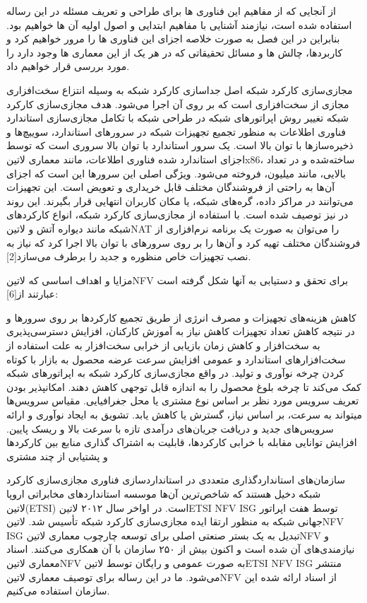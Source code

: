 از آنجایی که از مفاهیم این فناوری ها برای طراحی و تعریف مسئله در این رساله استفاده شده است، نیازمند آشنایی با مفاهیم ابتدایی و اصول اولیه آن ها خواهیم بود. بنابراین در این فصل به صورت خلاصه اجزای این فناوری ها را مرور خواهیم کرد و کاربردها، چالش ها و مسائل تحقیقاتی که در هر یک از این معماری ها وجود دارد را مورد بررسی قرار خواهیم داد.

مجازی‌سازی کارکرد شبکه اصل جداسازی کارکرد شبکه به وسیله انتزاع سخت‌افزاری مجازی از سخت‌افزاری است که بر روی آن اجرا می‌شود.
هدف مجازی‌سازی کارکرد شبکه تغییر روش اپراتورهای شبکه در طراحی شبکه با تکامل مجازی‌سازی استاندارد فناوری اطلاعات به منظور تجمیع تجهیزات شبکه در سرورهای استاندارد،
سوییچ‌ها و ذخیره‌سازها با توان بالا است.
یک سرور استاندارد با توان بالا سروری است که توسط اجزای استاندارد شده فناوری اطلاعات، مانند معماری ‌لاتین{x86}، ساخته‌شده و در تعداد بالایی، مانند میلیون، فروخته می‌شود.
ویژگی اصلی این سرورها این است که اجزای آن‌ها به راحتی از فروشندگان مختلف قابل خریداری و تعویض است.
این تجهیزات می‌توانند در مراکز داده، گره‌های شبکه، یا مکان کاربران انتهایی قرار بگیرند.
این روند در  نیز توصیف شده است. با استفاده از مجازی‌سازی کارکرد شبکه، انواع کارکردهای شبکه مانند دیواره آتش و ‌لاتین{NAT} را می‌توان
به صورت یک برنامه نرم‌افزاری از فروشندگان مختلف تهیه کرد و آن‌ها را بر روی سرورهای با توان بالا اجرا کرد که نیاز به نصب تجهیزات خاص منظوره و جدید را برطرف می‌سازد[2].

مزایا و اهداف اساسی که ‌لاتین{NFV} برای تحقق و دست‍یابی به آن‍ها شکل گرفته است عبارتند از[6]:

 کاهش هزینه‌های تجهیزات و مصرف انرژی از طریق تجمیع کارکردها بر روی سرورها و در نتیجه کاهش تعداد تجهیزات
 کاهش نیاز به آموزش کارکنان، افزایش دسترسی‌پذیری به سخت‌افزار و کاهش زمان بازیابی از خرابی سخت‌افزار به علت استفاده از سخت‌افزارهای استاندارد و عمومی
 افزایش سرعت عرضه محصول به بازار با کوتاه کردن چرخه نوآوری و تولید. در واقع مجازی‌سازی کارکرد شبکه به اپراتورهای شبکه کمک می‌کند تا چرخه بلوغ محصول را به اندازه قابل توجهی کاهش دهند.
 امکان‍پذیر بودن تعریف سرویس مورد نظر بر اساس نوع مشتری یا محل جغرافیایی. مقیاس سرویس‌ها می‍تواند به سرعت، بر اساس نیاز، گسترش یا کاهش یابد.
 تشویق به ایجاد نوآوری و ارائه سرویس‌های جدید و دریافت جریان‌های درآمدی تازه با سرعت بالا و ریسک پایین.
 افزایش توانایی مقابله با خرابی کارکردها، قابلیت به اشتراک گذاری منابع بین کارکردها و پشتیابی از چند مشتری

سازمان‌های استانداردگذاری متعددی در استانداردسازی فناوری مجازی‌سازی کارکرد شبکه دخیل هستند که شاخص‌ترین آن‌ها موسسه استانداردهای مخابراتی اروپا ‌لاتین{(ETSI)} است.
در اواخر سال ۲۰۱۲ ‌لاتین{ETSI NFV ISG} توسط هفت اپراتور جهانی شبکه به منظور ارتقا ایده مجازی‌سازی کارکرد شبکه تأسیس شد.
‌لاتین{NFV ISG} تبدیل به یک بستر صنعتی اصلی برای توسعه چارچوب معماری ‌لاتین{NFV} و نیازمندی‌های آن شده است
و اکنون بیش از ۲۵۰ سازمان با آن همکاری می‌کنند. اسناد معماری ‌لاتین{NFV} به صورت عمومی و رایگان توسط ‌لاتین{ETSI NFV ISG} منتشر می‌شود.
ما در این رساله برای توصیف معماری ‌لاتین{NFV} از اسناد ارائه شده این سازمان استفاده می‌کنیم.

